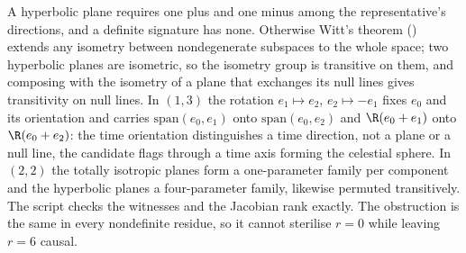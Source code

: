 A hyperbolic plane requires one plus and one minus among the representative's directions, and a definite signature has none. Otherwise Witt's theorem () extends any isometry between nondegenerate subspaces to the whole space; two hyperbolic planes are isometric, so the isometry group is transitive on them, and composing with the isometry of a plane that exchanges its null lines gives transitivity on null lines. In $(1,3)$ the rotation $e_{1} \mapsto e_{2}$, $e_{2} \mapsto -e_{1}$ fixes $e_{0}$ and its orientation and carries $\mathrm{span}(e_{0}, e_{1})$ onto $\mathrm{span}(e_{0}, e_{2})$ and $\R(e_{0} + e_{1})$ onto $\R(e_{0} + e_{2})$: the time orientation distinguishes a time direction, not a plane or a null line, the candidate flags through a time axis forming the celestial sphere. In $(2,2)$ the totally isotropic planes form a one-parameter family per component and the hyperbolic planes a four-parameter family, likewise permuted transitively. The script checks the witnesses and the Jacobian rank exactly. The obstruction is the same in every nondefinite residue, so it cannot sterilise $r = 0$ while leaving $r = 6$ causal.
